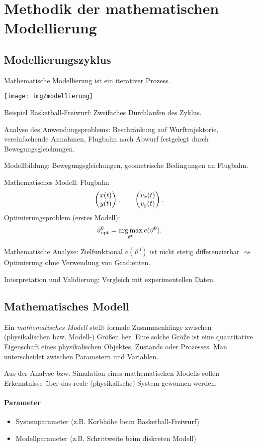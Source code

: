 \chapter{Methodik der mathematischen Modellierung}
\section{Modellierungszyklus}
Mathematische Modellierung ist ein iterativer Prozess.

\begin{center}
  \texttt{[image: img/modellierung]}
\end{center}

Beispiel Basketball-Freiwurf: Zweifaches Durchlaufen des Zyklus.

Analyse des Anwendungsproblems: Beschränkung auf Wurftrajektorie,
vereinfachende Annahmen, Flugbahn nach Abwurf festgelegt durch Bewegungsgleichungen.

Modellbildung: Bewegungsgleichungen, geometrische Bedingungen an Flugbahn.

Mathematisches Modell: Flugbahn
\[ \begin{pmatrix}x(t)\\y(t)\end{pmatrix}, \qquad \begin{pmatrix}v_x(t)\\v_y(t)\end{pmatrix}. \]
Optimierungsproblem (erstes Modell):
\[ \vartheta_{\mathrm{opt}}^0 = \operatorname*{arg\,max}_{\vartheta^0} e( \vartheta^0). \]

Mathematische Analyse: Zielfunktional $e(\vartheta^0)$ ist nicht stetig
differenzierbar $\rightsquigarrow$ Optimierung ohne Verwendung von Gradienten.

Interpretation und Validierung: Vergleich mit experimentellen Daten.

\section{Mathematisches Modell}
\begin{defn*}
  Ein \emph{mathematisches Modell} stellt formale Zusammenhänge zwischen
  (physikalischen bzw. Modell-) Größen her. Eine solche Größe ist eine
  quantitative Eigenschaft eines physikalischen Objektes, Zustands oder
  Prozesses. Man unterscheidet zwischen Parametern und Variablen.

  Aus der Analyse bzw. Simulation eines mathematischen Modells sollen
  Erkenntnisse über das reale (physikalische) System gewonnen werden.
\end{defn*}

\subsubsection*{Parameter}
\begin{itemize}
\item Systemparameter (z.B. Korbhöhe beim Basketball-Freiwurf)
\item Modellparameter (z.B. Schrittweite beim diskreten Modell)
\end{itemize}

